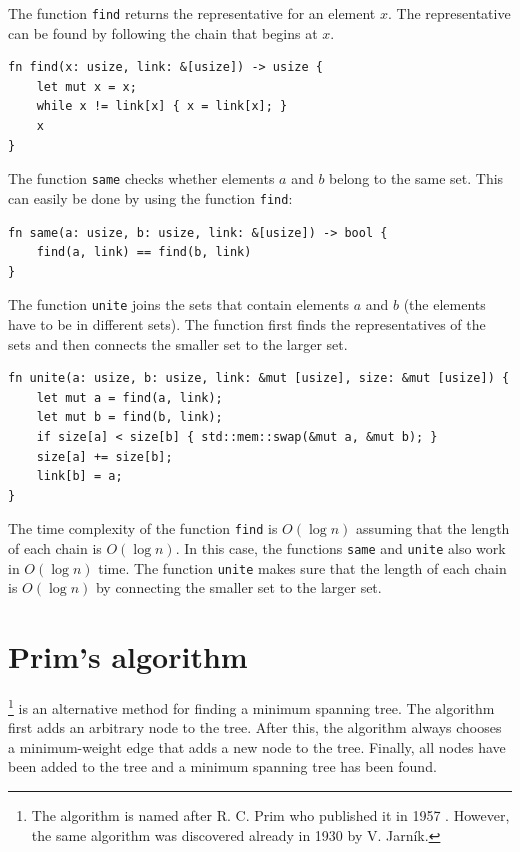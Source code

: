 The function \texttt{find} returns
the representative for an element $x$.
The representative can be found by following
the chain that begins at $x$.

\begin{lstlisting}
fn find(x: usize, link: &[usize]) -> usize {
    let mut x = x;
    while x != link[x] { x = link[x]; }
    x
}
\end{lstlisting}

The function \texttt{same} checks
whether elements $a$ and $b$ belong to the same set.
This can easily be done by using the
function \texttt{find}:

\begin{lstlisting}
fn same(a: usize, b: usize, link: &[usize]) -> bool {
    find(a, link) == find(b, link)
}
\end{lstlisting}

\begin{samepage}
The function \texttt{unite} joins the sets
that contain elements $a$ and $b$
(the elements have to be in different sets).
The function first finds the representatives
of the sets and then connects the smaller
set to the larger set.

\begin{lstlisting}
fn unite(a: usize, b: usize, link: &mut [usize], size: &mut [usize]) {
    let mut a = find(a, link);
    let mut b = find(b, link);
    if size[a] < size[b] { std::mem::swap(&mut a, &mut b); }
    size[a] += size[b];
    link[b] = a;
}
\end{lstlisting}
\end{samepage}

The time complexity of the function \texttt{find}
is $O(\log n)$ assuming that the length of each
chain is $O(\log n)$.
In this case, the functions \texttt{same} and \texttt{unite}
also work in $O(\log n)$ time.
The function \texttt{unite} makes sure that the
length of each chain is $O(\log n)$ by connecting
the smaller set to the larger set.

\section{Prim's algorithm}


\footnote{The algorithm is
named after R. C. Prim who published it in 1957 \cite{pri57}.
However, the same algorithm was discovered already in 1930
by V. Jarník.} is an alternative method
for finding a minimum spanning tree.
The algorithm first adds an arbitrary node
to the tree.
After this, the algorithm always chooses
a minimum-weight edge that
adds a new node to the tree.
Finally, all nodes have been added to the tree
and a minimum spanning tree has been found.

